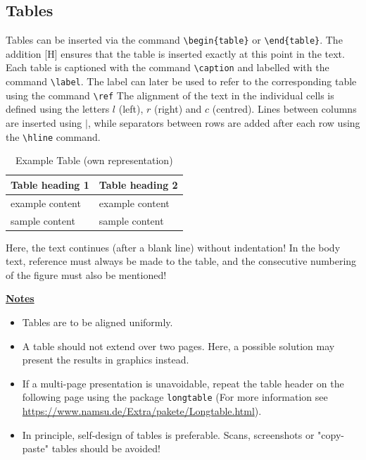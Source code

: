 \subsection{Tables}
Tables can be inserted via the command \verb!\begin{table}! or \verb!\end{table}!. The addition [H] ensures that the table is inserted exactly at this point in the text. Each table is captioned with the command \verb!\caption! and labelled with the command \verb!\label!. The label can later be used to refer to the corresponding table using the command \verb!\ref! The alignment of the text in the individual cells is defined using the letters $l$ (left), $r$ (right) and $c$ (centred). Lines between columns are inserted using $|$, while separators between rows are added after each row using the \verb!\hline! command.

\begin{table}[H]
    \centering
    \caption{Example Table (own representation)}
    \begin{tabular}{|l|l|}
    \hline
        Table heading 1 & Table heading 2\\
        \hline
         example content & example content \\
         \hline
         sample content & sample content\\
         \hline
    \end{tabular}
    \label{tab:my_label}
\end{table}

\noindent
Here, the text continues (after a blank line) without indentation! In the body text, reference must always be made to the table, and the consecutive numbering of the figure must also be mentioned!\\
\newpage

\noindent
\textbf{\uline{Notes}}
\begin{itemize}
    \item Tables are to be aligned uniformly.
    \item A table should not extend over two pages. Here, a possible solution may present the results in graphics instead.
    \item If a multi-page presentation is unavoidable, repeat the table header on the following page using the package \verb!longtable! (For more information see \url{https://www.namsu.de/Extra/pakete/Longtable.html}).
    \item In principle, self-design of tables is preferable. Scans, screenshots or "copy-paste" tables should be avoided! 
\end{itemize}


